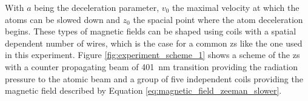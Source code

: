 With $a$ being the deceleration parameter, $v_0$ the maximal velocity at which the atoms can be slowed down and $z_0$ the spacial point where the atom deceleration begins. These types of magnetic fields can be shaped using coils with a spatial dependent number of wires, which is the case for a common \acf{zs} like the one used in this experiment. Figure \ref{fig:experiment_scheme_1} shows a scheme of the \ac{zs} with a counter propagating beam of \SI{401}{\nano\meter} transition providing the radiation pressure to the atomic beam and a group of five independent coils providing the magnetic field described by Equation \eqref{eq:magnetic_field_zeeman_slower}.

